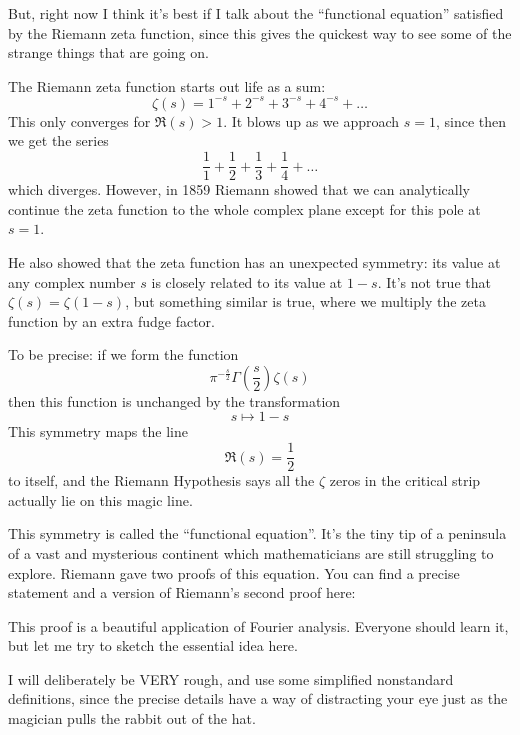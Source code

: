 \documentclass{article}
\def\tightlist{}
\renewcommand{\texttt}[1]{%
  \begingroup
  \ttfamily
  \begingroup\lccode`~=`/\lowercase{\endgroup\def~}{/\discretionary{}{}{}}%
  \begingroup\lccode`~=`[\lowercase{\endgroup\def~}{[\discretionary{}{}{}}%
  \begingroup\lccode`~=`.\lowercase{\endgroup\def~}{.\discretionary{}{}{}}%
  \catcode`/=\active\catcode`[=\active\catcode`.=\active
  \scantokens{#1\noexpand}%
  \endgroup
}
\begin{document}
But, right now I think it's best if I talk about the ``functional
equation'' satisfied by the Riemann zeta function, since this gives the
quickest way to see some of the strange things that are going on.

The Riemann zeta function starts out life as a sum:
\[\zeta(s) = 1^{-s} + 2^{-s} + 3^{-s} + 4^{-s} + \ldots\] This only
converges for \(\Re(s) > 1\). It blows up as we approach \(s = 1\),
since then we get the series
\[\frac11 + \frac12 + \frac13 + \frac14 + \ldots\] which diverges.
However, in 1859 Riemann showed that we can analytically continue the
zeta function to the whole complex plane except for this pole at
\(s = 1\).

He also showed that the zeta function has an unexpected symmetry: its
value at any complex number \(s\) is closely related to its value at
\(1-s\). It's not true that \(\zeta(s) = \zeta(1-s)\), but something
similar is true, where we multiply the zeta function by an extra fudge
factor.

To be precise: if we form the function
\[\pi ^{-\frac{s}{2}} \Gamma\left(\frac{s}{2}\right) \zeta(s)\] then this
function is unchanged by the transformation \[s \mapsto 1 - s\] This
symmetry maps the line \[\Re(s) = \frac12\] to itself, and the Riemann
Hypothesis says all the \(\zeta\) zeros in the critical strip actually
lie on this magic line.

This symmetry is called the ``functional equation''. It's the tiny tip
of a peninsula of a vast and mysterious continent which mathematicians
are still struggling to explore. Riemann gave two proofs of this
equation. You can find a precise statement and a version of Riemann's
second proof here:


This proof is a beautiful application of Fourier analysis. Everyone
should learn it, but let me try to sketch the essential idea here.

I will deliberately be VERY rough, and use some simplified nonstandard
definitions, since the precise details have a way of distracting your
eye just as the magician pulls the rabbit out of the hat.
\end{document}
